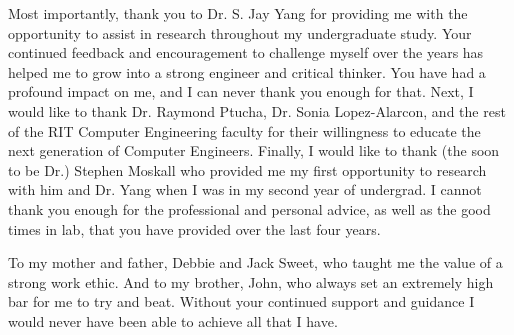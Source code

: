 %
%
%


\frontmatter


\begin{acknowledgments}
	\vfill
	\begin{center}
		\indent Most importantly, thank you to Dr. S. Jay Yang for providing me with the opportunity to assist in research throughout my undergraduate study. Your continued feedback and encouragement to challenge myself over the years has helped me to grow into a strong engineer and critical thinker. You have had a profound impact on me, and I can never thank you enough for that. Next, I would like to thank Dr. Raymond Ptucha, Dr. Sonia Lopez-Alarcon, and the rest of the RIT Computer Engineering faculty for their willingness to educate the next generation of Computer Engineers. Finally, I would like to thank (the soon to be Dr.) Stephen Moskall who provided me my first opportunity to research with him and Dr. Yang when I was in my second year of undergrad. I cannot thank you enough for the professional and personal advice, as well as the good times in lab, that you have provided over the last four years.  
	\end{center}
	\vfill
\end{acknowledgments}


\begin{dedication}
	\vfill
	\begin{center}
		To my mother and father, Debbie and Jack Sweet, who taught me the value of a strong work ethic. And to my brother, John, who always set an extremely high bar for me to try and beat.  Without your continued support and guidance I would never have been able to achieve all that I have. 
	\end{center}
	\vfill
\end{dedication}

